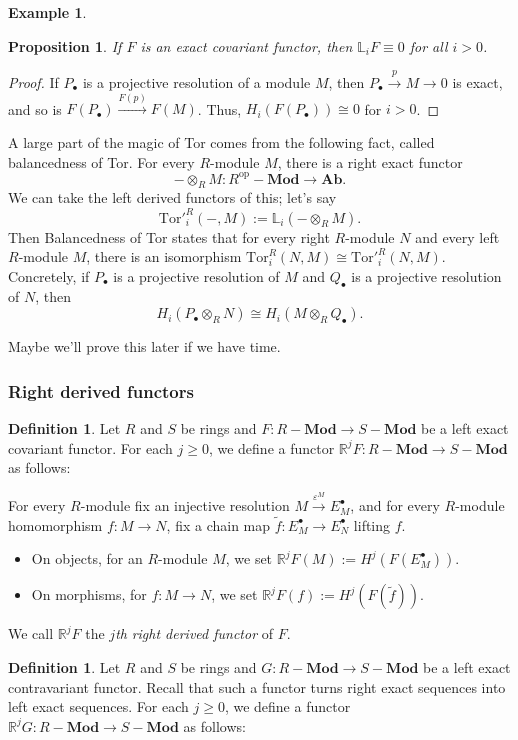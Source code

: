 \documentclass{amsart}[12pt]
\newcommand{\Tor}{\mathrm{Tor}}
\newcommand{\bR}{{\mathbb{R}}}
\newcommand{\bL}{{\mathbb{L}}}
\newcommand{\op}{\mathrm{op}}
\newcommand{\DEF}[1]{\emph{#1}\index{#1}}
\numberwithin{equation}{section}
\theoremstyle{plain} %
\newtheorem{prop}[equation]{Proposition}
\theoremstyle{definition}
\newtheorem{defn}[equation]{Definition}
\newtheorem{ex}[equation]{Example}
\theoremstyle{remark}
\newcommand{\xra}[1]{\xrightarrow{#1}}
\newcommand{\Ab}{\mathbf{Ab}}
\newcommand{\Mod}[1]{#1-\mathbf{Mod}}
\begin{document}
\begin{ex}
\begin{prop} If $F$ is an exact covariant functor, then $\bL_i F \equiv 0$ for all $i>0$.
\end{prop}
\begin{proof}
If $P_\bullet$ is a projective resolution of a module $M$, then $P_\bullet \xra{p} M \to 0$ is exact, and so is $F (P_\bullet ) \xra{F (p)} F( M)$. Thus, $H_i (F  (P_\bullet)) \cong 0$ for $i>0$.
\end{proof}

A large part of the magic of Tor comes from the following fact, called balancedness of Tor. For every $R$-module $M$, there is a right exact functor 
\[ - \otimes_R M : \Mod{R^\op} \to \Ab.\]
We can take the left derived functors of this; let's say 
\[{\Tor'}_i^R(-,M) := \bL_i (-\otimes_R M).\]
Then Balancedness of Tor states that for every  right $R$-module $N$ and every left $R$-module $M$, there is an isomorphism $\Tor_i^R(N,M) \cong {\Tor'}_i^R(N,M)$.
Concretely, if $P_\bullet$ is a projective resolution of $M$ and $Q_\bullet$ is a projective resolution of $N$, then
\[ H_i(P_\bullet \otimes_R N) \cong H_i(M\otimes_R Q_\bullet).\]

Maybe we'll prove this later if we have time.

\subsubsection{Right derived functors}



\begin{defn}
\label{def:rightderived1}
 Let $R$ and $S$ be rings and $F: \Mod{R} \to \Mod{S}$ be a left exact covariant functor. 
For each $j \geq 0$, we define a functor $\bR^j F : \Mod{R} \to \Mod{S}$ as follows:

For every $R$-module fix an injective resolution $M \xra{\varepsilon^M} E^\bullet_M$, and for every $R$-module homomorphism $f: M \to N$, fix a chain map $\tilde{f}: E^\bullet_M \to E^\bullet_N$ lifting $f$.
\begin{itemize}
\item On objects, for an $R$-module $M$, we set $\bR^j F(M) := H^j(F(E^\bullet_M)).$
\item On morphisms, for $f:M\to N$, we set $\bR^j F(f) := H^j(F(\tilde{f}))$.
\end{itemize} 
We call $\bR^j F$ the \emph{$j$th} \DEF{right derived functor} of $F$.
\end{defn}

\begin{defn}
\label{def:rightderived2}
 Let $R$ and $S$ be rings and $G: \Mod{R} \to \Mod{S}$ be a left exact contravariant functor. Recall that such a functor turns right exact sequences into left exact sequences.
For each $j \geq 0$, we define a functor $\bR^j G : \Mod{R} \to \Mod{S}$ as follows:


\end{defn}
\end{ex}
\end{document}
